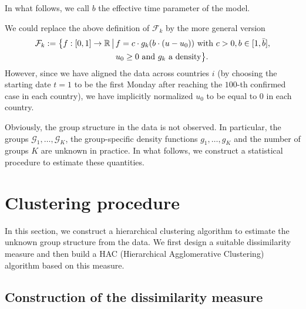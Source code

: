 \documentclass[a4paper,12pt]{article}
\numberwithin{equation}{section}
\begin{document}
In what follows, we call $b$ the effective time parameter of the model. 


\begin{remark}
We could replace the above definition of $\mathcal{F}_k$ by the more general version 
\begin{align*}
\mathcal{F}_k := \big\{ f:[0, 1] \rightarrow \mathbb{R} \,\big|\, & f = c \cdot g_k(b \cdot (u-u_0)) \text{ with } c>0, b\in [1, \bar{b}], \\ & u_0 \ge 0 \text{ and } g_k \text{ a density} \big\}. 
\end{align*}
However, since we have aligned the data across countries $i$ (by choosing the starting date $t=1$ to be the first Monday after reaching the $100$-th confirmed case in each country), we have implicitly normalized $u_0$ to be equal to $0$ in each country. 
\end{remark}


Obviously, the group structure in the data is not observed. In particular, the groups $\mathcal{G}_1,\ldots,\mathcal{G}_K$, the group-specific density functions $g_1,\ldots,g_K$ and the number of groups $K$ are unknown in practice. In what follows, we construct a statistical procedure to estimate these quantities. 



\section{Clustering procedure}


In this section, we construct a hierarchical clustering algorithm to estimate the unknown group structure from the data. We first design a suitable dissimilarity measure and then build a HAC (Hierarchical Agglomerative Clustering) algorithm based on this measure.


\subsection{Construction of the dissimilarity measure} 
\end{document}

